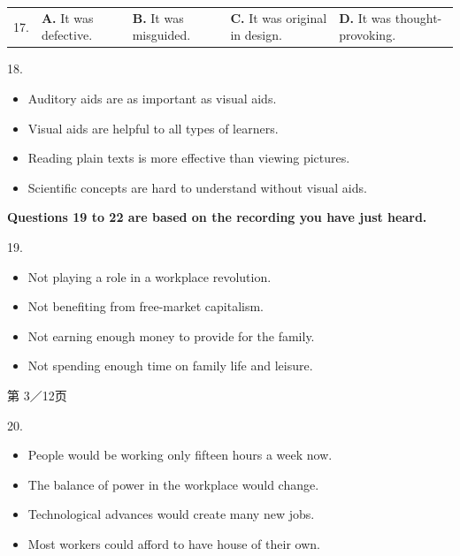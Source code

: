 \documentclass[UTF8,11pt]{ctexart}
\begin{document}
\noindent\begin{tabularx}{\linewidth}{@{}lXXXX@{}}17. & \textbf{A.} It was defective. & \textbf{B.} It was misguided. & \textbf{C.} It was original in design. & \textbf{D.} It was thought-provoking.\\\end{tabularx}\par

18.


\begin{itemize}[leftmargin=2em,itemsep=.2em,topsep=.4em]\item[A.] Auditory aids are as important as visual aids.
\end{itemize}

\begin{itemize}[leftmargin=2em,itemsep=.2em,topsep=.4em]\item[B.] Visual aids are helpful to all types of learners.
\item[C.] Reading plain texts is more effective than viewing pictures.
\item[D.] Scientific concepts are hard to understand without visual aids.
\end{itemize}

\textbf{Questions 19 to 22 are based on the recording you have just heard.}


19.


\begin{itemize}[leftmargin=2em,itemsep=.2em,topsep=.4em]\item[A.] Not playing a role in a workplace revolution.
\item[B.] Not benefiting from free-market capitalism.
\item[C.] Not earning enough money to provide for the family.
\item[D.] Not spending enough time on family life and leisure.
\end{itemize}

第 3／12页


20.


\begin{itemize}[leftmargin=2em,itemsep=.2em,topsep=.4em]\item[A.] People would be working only fifteen hours a week now.
\item[B.] The balance of power in the workplace would change.
\item[C.] Technological advances would create many new jobs.
\item[D.] Most workers could afford to have house of their own.
\end{itemize}
\end{document}
